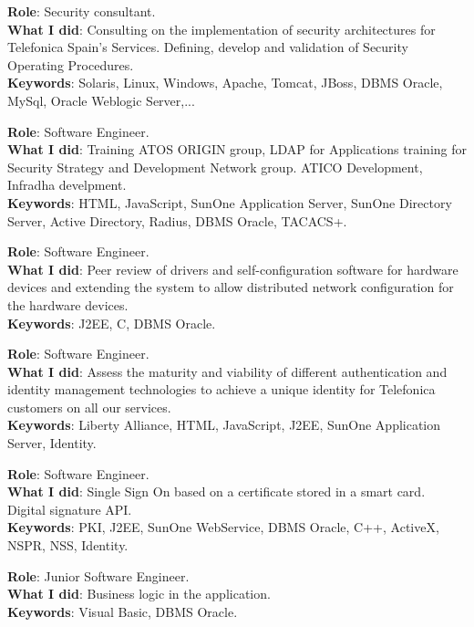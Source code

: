 \documentclass[]{resume}
\begin{document}
\begin{minipage}[t]{0.66\textwidth}

\textbf{Role}: Security consultant.\\
\textbf{What I did}: Consulting on the implementation of security architectures for Telefonica Spain's Services. Defining, develop and validation of Security Operating Procedures.\\
\textbf{Keywords}: Solaris, Linux, Windows, Apache, Tomcat, JBoss, DBMS Oracle, MySql, Oracle Weblogic Server,...
\sectionsep

\textbf{Role}: Software Engineer.\\
\textbf{What I did}: Training ATOS ORIGIN group, LDAP for Applications training for Security Strategy and Development Network group. ATICO Development, Infradha develpment.\\
\textbf{Keywords}: HTML, JavaScript, SunOne Application Server, SunOne Directory Server, Active Directory, Radius, DBMS Oracle, TACACS+.
\sectionsep

\descript{|}
\textbf{Role}: Software Engineer.\\
\textbf{What I did}: Peer review of drivers and self-configuration software for hardware devices and extending the system to allow distributed network configuration for the hardware devices.\\
\textbf{Keywords}: J2EE, C, DBMS Oracle.
\sectionsep

\textbf{Role}: Software Engineer.\\
\textbf{What I did}: Assess the maturity and viability of different authentication and identity management technologies to achieve a unique identity for Telefonica customers on all our services.\\
\textbf{Keywords}: Liberty Alliance, HTML, JavaScript, J2EE, SunOne Application Server, Identity.
\sectionsep

\textbf{Role}: Software Engineer.\\
\textbf{What I did}: Single Sign On based on a certificate stored in a smart card. Digital signature API.\\
\textbf{Keywords}: PKI, J2EE, SunOne WebService, DBMS Oracle, C++, ActiveX, NSPR, NSS, Identity.
\sectionsep

\textbf{Role}: Junior Software Engineer.\\
\textbf{What I did}: Business logic in the application.\\
\textbf{Keywords}: Visual Basic, DBMS Oracle.
\sectionsep

\end{minipage}
\end{document}
